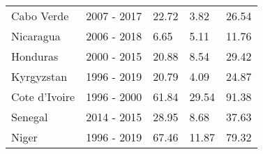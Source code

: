 \begin{table}[pos = H]
{{\begin{tabular}{lllll}
Cabo Verde & 2007 - 2017 & 22.72 & 3.82 & 26.54\\
Nicaragua & 2006 - 2018 & 6.65 & 5.11 & 11.76\\
Honduras & 2000 - 2015 & 20.88 & 8.54 & 29.42\\
\addlinespace
Kyrgyzstan & 1996 - 2019 & 20.79 & 4.09 & 24.87\\
Cote d’Ivoire & 1996 - 2000 & 61.84 & 29.54 & 91.38\\
Senegal & 2014 - 2015 & 28.95 & 8.68 & 37.63\\
Niger & 1996 - 2019 & 67.46 & 11.87 & 79.32\\
\bottomrule
\end{tabular}
}
}
\label{tbl-fgr_table}
\end{table}
